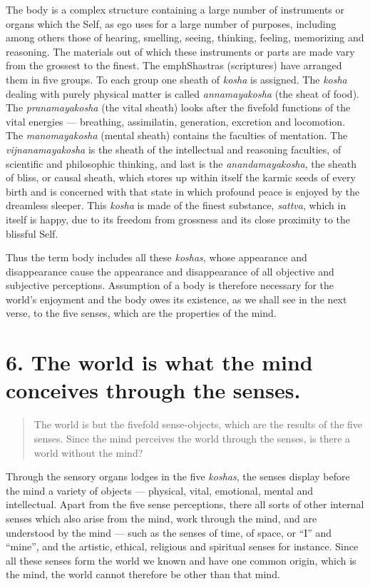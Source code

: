 \documentclass[12pt]{report}
\begin{document}

The body is a complex structure containing a large number of
instruments or organs which the Self, as ego uses for a large number
of purposes, including among others those of hearing, smelling,
seeing, thinking, feeling, memorizing and reasoning. The materials out
of which these instruments or parts are made vary from the grossest to
the finest. The emph{Shastras} (scriptures) have arranged them in five
groups. To each group one sheath of \emph{kosha} is assigned. The
\emph{kosha} dealing with purely physical matter is called
\emph{annamayakosha} (the sheat of food). The \emph{pranamayakosha}
(the vital sheath) looks after the fivefold functions of the vital
energies --- breathing, assimilatin, generation, excretion and
locomotion. The \emph{manomayakosha} (mental sheath) contains the
faculties of mentation. The \emph{vijnanamayakosha} is the sheath of
the intellectual and reasoning faculties, of scientific and
philosophic thinking, and last is the \emph{anandamayakosha}, the
sheath of bliss, or causal sheath, which stores up within itself the
karmic seeds of every birth and is concerned with that state in which
profound peace is enjoyed by the dreamless sleeper. This \emph{kosha}
is made of the finest substance, \emph{sattva}, which in itself is
happy, due to its freedom from grossness and its close proximity to
the blissful Self.

Thus the term body includes all these \emph{koshas}, whose appearance
and disappearance cause the appearance and disappearance of all
objective and subjective perceptions. Assumption of a body is
therefore necessary for the world's enjoyment and the body owes its
existence, as we shall see in the next verse, to the five senses,
which are the properties of the mind.

\section{6. The world is what the mind conceives through the senses.}

\begin{quote}
  The world is but the fivefold sense-objects, which are the results of
  the five senses. Since the mind perceives the world through the
  senses, is there a world without the mind?
\end{quote}


Through the sensory organs lodges in the five \emph{koshas}, the
senses display before the mind a variety of objects --- physical,
vital, emotional, mental and intellectual. Apart from the five sense
perceptions, there all sorts of other internal senses which also arise
from the mind, work through the mind, and are understood by the mind
--- such as the senses of time, of space, or ``I'' and ``mine'', and
the artistic, ethical, religious and spiritual senses for
instance. Since all these senses form the world we known and have one 
common origin, which is the mind, the world cannot therefore be other
than that mind.
\end{document}
